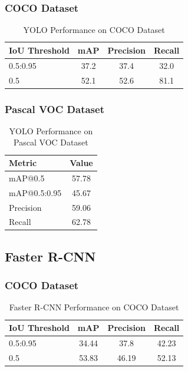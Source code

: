 \documentclass[12pt,a4paper]{article}
\begin{document}
\subsubsection{COCO Dataset}
\begin{table}[H]
    \centering
    \caption{YOLO Performance on COCO Dataset}
    \begin{tabular}{lccc}
        \toprule
        \textbf{IoU Threshold} & \textbf{mAP} & \textbf{Precision} & \textbf{Recall} \\
        \midrule
        0.5:0.95 & 37.2 & 37.4 & 32.0 \\
        0.5      & 52.1 & 52.6 & 81.1 \\
        \bottomrule
    \end{tabular}
\end{table}

\subsubsection{Pascal VOC Dataset}
\begin{table}[H]
    \centering
    \caption{YOLO Performance on Pascal VOC Dataset}
    \begin{tabular}{lc}
        \toprule
        \textbf{Metric} & \textbf{Value} \\
        \midrule
        mAP@0.5        & 57.78  \\
        mAP@0.5:0.95   & 45.67  \\
        Precision      & 59.06  \\
        Recall         & 62.78  \\

        \bottomrule
    \end{tabular}
\end{table}

\subsection{Faster R-CNN}

\subsubsection{COCO Dataset}
\begin{table}[H]
    \centering
    \caption{Faster R-CNN Performance on COCO Dataset}
    \begin{tabular}{lccc}
        \toprule
        \textbf{IoU Threshold} & \textbf{mAP} & \textbf{Precision} & \textbf{Recall} \\
        \midrule
        0.5:0.95 & 34.44 & 37.8  & 42.23 \\
        0.5      & 53.83 & 46.19 & 52.13 \\
        \bottomrule
    \end{tabular}
\end{table}
\end{document}
